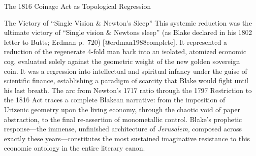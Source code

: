 \documentclass[
  ignorenonframetext,
]{beamer}
\begin{document}
\begin{frame}{The 1816 Coinage Act as Topological Regression}
\begin{block}{The Victory of ``Single Vision \& Newton's Sleep''}
\protect{}\label{the-victory-of-single-vision-newtons-sleep}
This systemic reduction was the ultimate victory of ``Single vision \&
Newtons sleep'' (as Blake declared in his 1802 letter to Butts; Erdman
p.~720) {[}@erdman1988complete{]}. It represented a reduction of the
regenerate 4-fold man back into an isolated, atomized economic cog,
evaluated solely against the geometric weight of the new golden
sovereign coin. It was a regression into intellectual and spiritual
infancy under the guise of scientific finance, establishing a paradigm
of scarcity that Blake would fight until his last breath. The arc from
Newton's 1717 ratio through the 1797 Restriction to the 1816 Act traces
a complete Blakean narrative: from the imposition of Urizenic geometry
upon the living economy, through the chaotic void of paper abstraction,
to the final re-assertion of monometallic control. Blake's prophetic
response---the immense, unfinished architecture of \emph{Jerusalem},
composed across exactly these years---constitutes the most sustained
imaginative resistance to this economic ontology in the entire literary
canon.
\end{block}
\end{frame}
\end{document}
